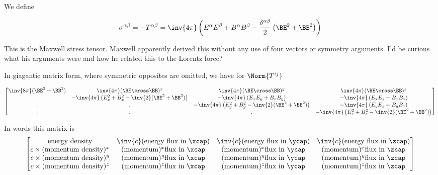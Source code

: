 We define

\begin{equation}\label{eqn:relativisticElectrodynamicsL23:n}
\sigma^{\alpha\beta}
=
-T^{\alpha\beta}
=
 \inv{4\pi} \left(
E^\alpha E^\beta
+B^\alpha B^\beta
- \frac{\delta^{\alpha\beta} }{2}
\left(
\BE^2 + \BB^2 
\right)
\right) 
\end{equation}

This is the Maxwell stress tensor.  Maxwell apparently derived this without any use of four vectors or symmetry arguments.  I'd be curious what his arguments were and how he related this to the Lorentz force?

In giagantic matrix form, where symmetric opposites are omitted, we have for $\Norm{T^{ij}}$

\begin{equation}\label{eqn:relativisticElectrodynamicsL23:n}
\begin{bmatrix}
\inv{8 \pi}(\BE^2 + \BB^2) & \inv{4\pi} (\BE \cross \BB)^x & \inv{4\pi} (\BE \cross \BB)^y & \inv{4\pi} (\BE \cross \BB)^z \\
. 
& -\inv{4 \pi}\left(E_x^2 + B_x^2 - \inv{2}(\BE^2 + \BB^2)\right) 
& -\inv{4 \pi}\left(E_x E_y + B_x B_y \right)
& -\inv{4 \pi}\left(E_x E_z + B_x B_z \right) \\
. & . & -\inv{4 \pi}\left(E_y^2 + B_y^2 - \inv{2}(\BE^2 + \BB^2)\right) & -\inv{4 \pi}\left(E_y E_z + B_y B_z \right) \\
. & . & . & -\inv{4 \pi}\left(E_z^2 + B_z^2 - \inv{2}(\BE^2 + \BB^2)\right) 
\end{bmatrix}
\end{equation}

In words this matrix is
\begin{equation}\label{eqn:relativisticElectrodynamicsL23:n}
\begin{bmatrix}
\text{energy density} & \inv{c} (\text{energy flux in $\xcap$}) & \inv{c} (\text{energy flux in $\ycap$}) & \inv{c} (\text{energy flux in $\zcap$}) \\
c \times (\text{momentum density})^x
& (\text{momentum})^x \text{flux in $\xcap$}
& (\text{momentum})^x \text{flux in $\ycap$}
& (\text{momentum})^x \text{flux in $\zcap$} \\
c \times (\text{momentum density})^y
& (\text{momentum})^y \text{flux in $\xcap$}
& (\text{momentum})^y \text{flux in $\ycap$}
& (\text{momentum})^y \text{flux in $\zcap$} \\
c \times (\text{momentum density})^z
& (\text{momentum})^z \text{flux in $\xcap$}
& (\text{momentum})^z \text{flux in $\ycap$}
& (\text{momentum})^z \text{flux in $\zcap$} \\
\end{bmatrix}
\end{equation}

\EndArticle
